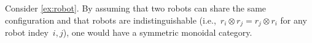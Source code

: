 \begin{example}
\label{ex:robot_2}
Consider \cref{ex:robot}. By assuming that two robots can share the same configuration and that robots are indistinguishable (i.e.,~$r_i\otimes r_j=r_j\otimes r_i$ for any robot indey~$i,j$), one would have a symmetric monoidal category.
\end{example}

